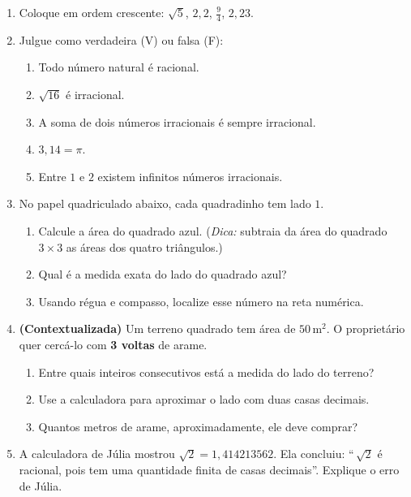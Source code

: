 \documentclass[11pt,a4paper]{article}
\begin{document}
\begin{enumerate}[label=\textbf{\arabic*.}]
  \item Coloque em ordem crescente: \quad $\sqrt{5}$, \quad $2{,}2$, \quad
  $\frac{9}{4}$, \quad $2{,}23$.

  \item Julgue como verdadeira (V) ou falsa (F):
  \begin{enumerate}[label=\alph*)]
    \item Todo número natural é racional.
    \item $\sqrt{16}$ é irracional.
    \item A soma de dois números irracionais é sempre irracional.
    \item $3{,}14 = \pi$.
    \item Entre $1$ e $2$ existem infinitos números irracionais.
  \end{enumerate}

  \item No papel quadriculado abaixo, cada quadradinho tem lado $1$.
  \begin{center}
  \end{center}
  \begin{enumerate}[label=\alph*)]
    \item Calcule a área do quadrado azul. (\emph{Dica:} subtraia da área do
          quadrado $3\times 3$ as áreas dos quatro triângulos.)
    \item Qual é a medida exata do lado do quadrado azul?
    \item Usando régua e compasso, localize esse número na reta numérica.
  \end{enumerate}

  \item \textbf{(Contextualizada)} Um terreno quadrado tem área de
  $50\,\text{m}^2$. O proprietário quer cercá-lo com \textbf{3 voltas} de arame.
  \begin{enumerate}[label=\alph*)]
    \item Entre quais inteiros consecutivos está a medida do lado do terreno?
    \item Use a calculadora para aproximar o lado com duas casas decimais.
    \item Quantos metros de arame, aproximadamente, ele deve comprar?
  \end{enumerate}

  \item A calculadora de Júlia mostrou $\sqrt{2} = 1{,}414213562$. Ela concluiu:
  ``\,$\sqrt{2}$ é racional, pois tem uma quantidade finita de casas decimais''.
  Explique o erro de Júlia.

\end{enumerate}
\end{document}

